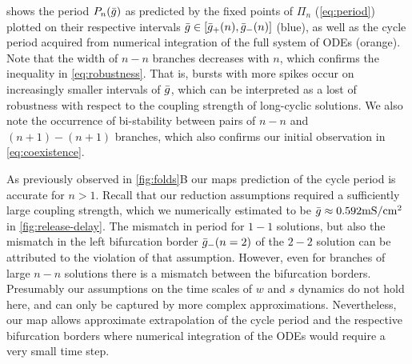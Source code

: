\documentclass[../manuscript.tex]{subfiles}
\begin{document}
 shows the period $P_n(\gbar)$ as predicted by the fixed points of $\Pi_n$ (\cref{eq:period}) plotted on their respective intervals $\gbar \in [\gbar_+(n),\gbar_-(n)]$ (blue), as well as the cycle period acquired from numerical integration of the full system of ODEs (orange).
Note that the width of $n-n$ branches decreases with $n$, which confirms the inequality in \cref{eq:robustness}.
That is, bursts with more spikes occur on increasingly smaller intervals of $\gbar$, which can be interpreted as a lost of robustness with respect to the coupling strength of long-cyclic solutions.
We also note the occurrence of bi-stability between pairs of $n-n$ and $(n+1)-(n+1)$ branches, which also confirms our initial observation in \cref{eq:coexistence}.

As previously observed in \cref{fig:folds}B our maps prediction of the cycle period is accurate for $n>1$.
Recall that our reduction assumptions required a sufficiently large coupling strength, which we numerically estimated to be $\gbar \approx 0.592\si{mS/cm^2}$ in \cref{fig:release-delay}.
The mismatch in period for $1-1$ solutions, but also the mismatch in the left bifurcation border $\gbar_-(n=2)$ of the $2-2$ solution can be attributed to the violation of that assumption.
However, even for branches of large $n-n$ solutions there is a mismatch between the bifurcation borders.
Presumably our assumptions on the time scales of $w$ and $s$ dynamics do not hold here, and can only be captured by more complex approximations.
Nevertheless, our map allows approximate extrapolation of the cycle period and the respective bifurcation borders where numerical integration of the ODEs would require a very small time step.
\end{document}
